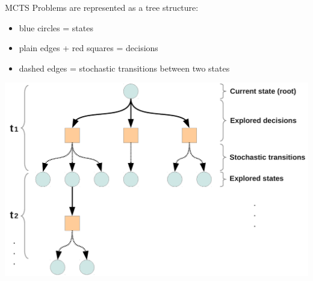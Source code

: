 \begin{frame}{MCTS}
    Problems are represented as a tree structure:
    \begin{itemize}
        \item blue circles = states
        \item plain edges + red squares = decisions
        \item dashed edges = stochastic transitions between two states
    \end{itemize}
    \begin{center}
        \includegraphics[width=.65\linewidth]{figs/tree}
    \end{center}
\end{frame}
